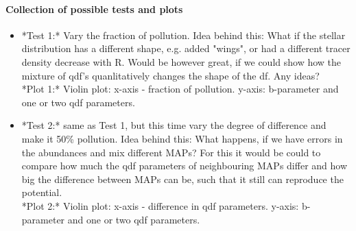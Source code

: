 
\paragraph{Collection of possible tests and plots}

\begin{itemize}
\item *Test 1:* Vary the fraction of pollution. Idea behind this: What if the stellar distribution has a different shape, e.g. added "wings", or had a different tracer density decrease with R. Would be however great, if we could show how the mixture of qdf's quanlitatively changes the shape of the df. Any ideas? \\
*Plot 1:* Violin plot: x-axis - fraction of pollution. y-axis: b-parameter and one or two qdf parameters.
\item *Test 2:* same as Test 1, but this time vary the degree of difference and make it 50\% pollution. Idea behind this: What happens, if we have errors in the abundances and mix different MAPs? For this it would be could to compare how much the qdf parameters of neighbouring MAPs differ and how big the difference between MAPs can be, such that it still can reproduce the potential. \\
*Plot 2:* Violin plot: x-axis - difference in qdf parameters. y-axis: b-parameter and one or two qdf parameters.
\end{itemize}
